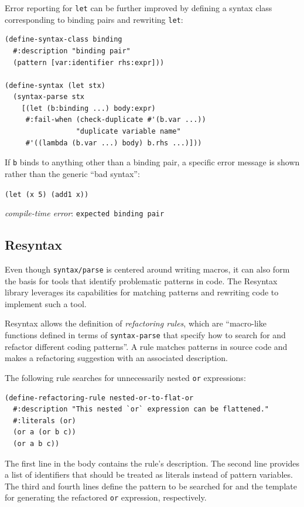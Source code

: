 \documentclass{juliacon}
\begin{document}
Error reporting for \texttt{let} can be further improved by defining a syntax
class corresponding to binding pairs and rewriting \texttt{let}:

\begin{lstlisting}[language=racket]
(define-syntax-class binding
  #:description "binding pair"
  (pattern [var:identifier rhs:expr]))

(define-syntax (let stx)
  (syntax-parse stx
    [(let (b:binding ...) body:expr)
     #:fail-when (check-duplicate #'(b.var ...))
                 "duplicate variable name"
     #'((lambda (b.var ...) body) b.rhs ...)]))
\end{lstlisting}

If \texttt{b} binds to anything other than a binding pair, a specific error
message is shown rather than the generic ``bad syntax'':

\vspace{1em}

\texttt{(let (x 5) (add1 x))}

\hspace{0.3cm}\textit{compile-time error}: \texttt{expected binding pair}

\subsection{Resyntax}
\label{sec:org37726eb}

Even though \texttt{syntax/parse} is centered around writing macros, it can
also form the basis for tools that identify problematic patterns in
code. The Resyntax library \cite{resyntax} leverages its capabilities
for matching patterns and rewriting code to implement such a tool.

Resyntax allows the definition of \emph{refactoring rules}, which are
``macro-like functions defined in terms of \texttt{syntax-parse} that specify
how to search for and refactor different coding patterns''. A rule
matches patterns in source code and makes a refactoring suggestion
with an associated description.

The following rule searches for unnecessarily nested \texttt{or} expressions:

\begin{lstlisting}[language=racket]
(define-refactoring-rule nested-or-to-flat-or
  #:description "This nested `or` expression can be flattened."
  #:literals (or)
  (or a (or b c))
  (or a b c))
\end{lstlisting}

The first line in the body contains the rule's description. The second
line provides a list of identifiers that should be treated as literals
instead of pattern variables. The third and fourth lines define the
pattern to be searched for and the template for generating the
refactored \texttt{or} expression, respectively.
\end{document}
